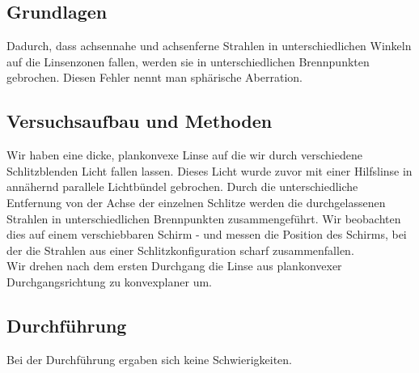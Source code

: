 \documentclass{article}
\begin{document}
\subsection{Grundlagen}
Dadurch, dass achsennahe und achsenferne Strahlen in unterschiedlichen Winkeln auf die Linsenzonen fallen, werden sie in unterschiedlichen Brennpunkten gebrochen. Diesen Fehler nennt man sphärische Aberration.
\subsection{Versuchsaufbau und Methoden}
Wir haben eine dicke, plankonvexe Linse auf die wir durch verschiedene Schlitzblenden Licht fallen lassen. Dieses Licht wurde zuvor mit einer Hilfslinse in annähernd parallele Lichtbündel gebrochen. Durch die unterschiedliche Entfernung von der Achse der einzelnen Schlitze werden die durchgelassenen Strahlen in unterschiedlichen Brennpunkten zusammengeführt. Wir beobachten dies auf einem verschiebbaren Schirm - und messen die Position des Schirms, bei der die Strahlen aus einer Schlitzkonfiguration scharf zusammenfallen. \\
Wir drehen nach dem ersten Durchgang die Linse aus plankonvexer Durchgangsrichtung zu konvexplaner um.
\subsection{Durchführung}
Bei der Durchführung ergaben sich keine Schwierigkeiten.
\end{document}
